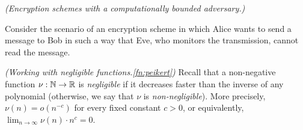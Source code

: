 \begin{questions}
  \question \emph{(Encryption schemes with a computationally bounded adversary.)}  
	
	Consider the scenario of an encryption scheme in which Alice wants to send a message to Bob in such a way
	that Eve, who monitors the transmission, cannot read the message.
	



  \question \emph{(Working with negligible functions.\cref{fn:peikert})}  Recall that a
  non-negative function $\nu : \mathbb{N} \to \mathbb{R}$ is \emph{negligible} if it
  decreases faster than the inverse of any polynomial (otherwise, we
  say that $\nu$ is \emph{non-negligible}).  More precisely, $\nu(n) =
  o(n^{-c})$ for every fixed constant $c > 0$, or equivalently,
  $\lim_{n \to \infty} \nu(n) \cdot n^{c} = 0$. 


\end{questions}
